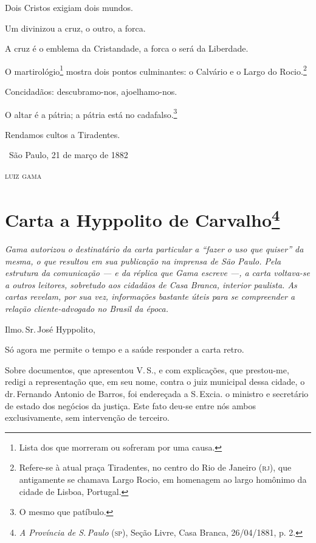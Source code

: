 Dois Cristos exigiam dois mundos.

Um divinizou a cruz, o outro, a forca.

A cruz é o emblema da Cristandade, a forca o será da Liberdade.

O martirológio\footnote{Lista dos que morreram ou sofreram por uma
  causa.} mostra dois pontos culminantes: o Calvário e o Largo do
Rocio.\footnote{Refere-se à atual praça Tiradentes, no centro do Rio
  de Janeiro (\textsc{rj}), que antigamente se chamava Largo Rocio, em
  homenagem ao largo homônimo da cidade de Lisboa, Portugal.}

Concidadãos: descubramo-nos, ajoelhamo-nos.

O altar é a pátria; a pátria está no cadafalso.\footnote{O mesmo que
  patíbulo.}

Rendamos cultos a Tiradentes.

\medskip

\hfill\ São Paulo, 21 de março de 1882

\hfill\textsc{luiz gama}

\chapter{Carta a Hyppolito de Carvalho\footnote{\emph{A
  Província de S.\,Paulo} (\textsc{sp}), Seção Livre, Casa Branca, 26/04/1881, p.
  2.}}

\begin{resumo}
\emph{Gama autorizou o destinatário da carta particular a ``fazer o uso que quiser''
da mesma, o que resultou em sua publicação na
imprensa de São Paulo. Pela estrutura da comunicação --- e da réplica que
Gama escreve ---, a carta voltava-se a outros
leitores, sobretudo aos cidadãos de Casa Branca, interior paulista. As
cartas revelam, por sua vez, informações bastante úteis para se
compreender a relação cliente-advogado no Brasil da época.}
\end{resumo}

Ilmo.\,Sr.\,José Hyppolito,

Só agora me permite o tempo e a saúde responder a carta retro.

Sobre documentos, que
apresentou V.\,S., e com explicações, que prestou-me, redigi a
representação que, em seu nome, contra o juiz municipal dessa cidade, o
dr.\,Fernando Antonio de Barros, foi endereçada a S.\,Excia. o ministro e
secretário de estado dos negócios da justiça. Este fato deu-se entre nós
ambos exclusivamente, sem intervenção de terceiro.

